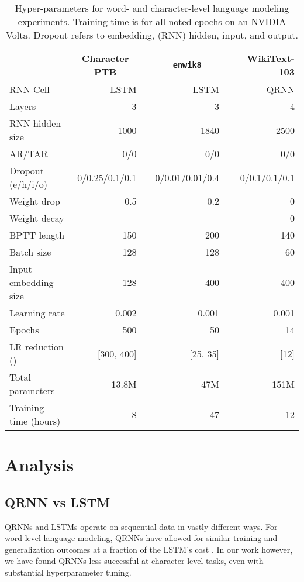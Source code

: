 \documentclass{article}
\newcommand{\enwik}{\texttt{enwik8}\xspace}
\begin{document}
\begin{table*}
\renewcommand{\arraystretch}{1.1}
\begin{center}
 \begin{tabular}{@{} lrrrrr @{}} 
 \toprule[1.5pt]
  &  \multicolumn{1}{c}{Character PTB} &  & \multicolumn{1}{c}{\enwik} & & WikiText-103 \\ 
\midrule
 RNN Cell  & \small{LSTM} & & \small{LSTM} & & \small{QRNN}\\ 
 Layers & 3 & & 3 & & 4 \\
 RNN hidden size & 1000 & & 1840 & & 2500 \\
 AR/TAR & 0/0 & & 0/0 & & 0/0 \\
 Dropout (e/h/i/o) & 0/0.25/0.1/0.1 & & 0/0.01/0.01/0.4 & & 0/0.1/0.1/0.1 \\
 Weight drop & 0.5 & & 0.2 & & 0 \\
 \midrule
 Weight decay &  & &  & & 0 \\
 BPTT length & 150 & & 200 & & 140 \\
 Batch size & 128 & & 128 & & 60 \\
 Input embedding size & 128 & & 400 & & 400 \\
 Learning rate & 0.002 & & 0.001 & & 0.001 \\
 Epochs & 500 & & 50 & & 14 \\
 LR reduction () & [300, 400] & & [25, 35] & & [12] \\
 \midrule
 Total parameters & 13.8M & & 47M & & 151M \\
 Training time (hours) & 8 & & 47 & & 12 \\
 \bottomrule[1.5pt]
\end{tabular}
\caption{
Hyper-parameters for word- and character-level language modeling experiments.
Training time is for all noted epochs on an NVIDIA Volta.
Dropout refers to embedding, (RNN) hidden, input, and output. \label{table:fullhypers}}
\end{center}
\end{table*}

\section{Analysis}

\subsection{QRNN vs LSTM}
QRNNs and LSTMs operate on sequential data in vastly different ways.
For word-level language modeling, QRNNs have allowed for similar training and generalization outcomes at a fraction of the LSTM's cost \citep{merity2018regularizing}.
In our work however, we have found QRNNs less successful at character-level tasks, even with substantial hyperparameter tuning.
\end{document}
